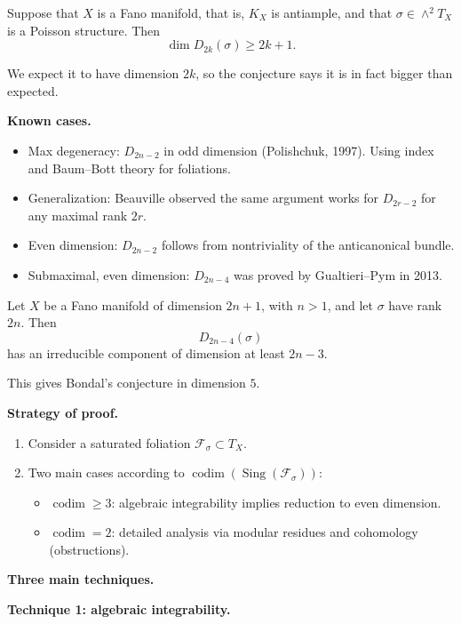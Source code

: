 Suppose that $X$ is a Fano manifold,
that is, $K_X$ is antiample, and that
$\sigma\in \wedge^2T_X$ is a Poisson
structure.
Then
$$
\dim D_{2k}(\sigma)\geq 2k+1.
$$

We expect it to have dimension $2k$,
so the conjecture says it is in fact
bigger than expected.

\medskip\noindent
{\bf Known cases.}

\begin{itemize}
\item Max degeneracy:
$D_{2n-2}$ in odd dimension
(Polishchuk, 1997).
Using index and Baum--Bott theory for
foliations.
\item Generalization:
Beauville observed the same argument
works for $D_{2r-2}$ for any maximal
rank $2r$.
\item Even dimension:
$D_{2n-2}$ follows from nontriviality
of the anticanonical bundle.
\item Submaximal, even dimension:
$D_{2n-4}$ was proved by
Gualtieri--Pym in 2013.
\end{itemize}

\begin{theorem}
\label{theorem-dppt}
Let $X$ be a Fano manifold of
dimension $2n+1$, with $n>1$, and let
$\sigma$ have rank $2n$.
Then
$$
D_{2n-4}(\sigma)
$$
has an irreducible component of
dimension at least $2n-3$.
\end{theorem}

This gives Bondal's conjecture in
dimension $5$.

\medskip\noindent
{\bf Strategy of proof.}

\begin{enumerate}
\item Consider a saturated foliation
$\mathcal F_\sigma\subset T_X$.
\item Two main cases according to
$\operatorname{codim}(\operatorname{Sing}
(\mathcal F_\sigma))$:
\begin{itemize}
\item $\operatorname{codim}\geq 3$:
algebraic integrability implies
reduction to even dimension.
\item $\operatorname{codim}=2$:
detailed analysis via modular
residues and cohomology
(obstructions).
\end{itemize}
\end{enumerate}

\medskip\noindent
{\bf Three main techniques.}

\medskip\noindent
{\bf Technique 1: algebraic
integrability.}

